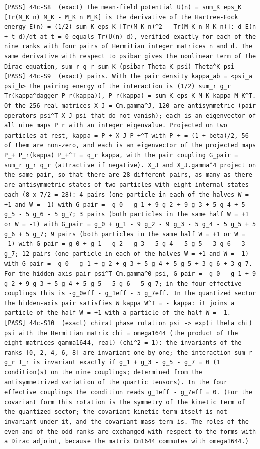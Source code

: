 \documentclass[
  10pt,
]{article}
\begin{document}
\begin{verbatim}
[PASS] 44c-S8  (exact) the mean-field potential U(n) = sum_K eps_K [Tr(M_K n) M_K - M_K n M_K] is the derivative of the Hartree-Fock energy E(n) = (1/2) sum_K eps_K [Tr(M_K n)^2 - Tr(M_K n M_K n)]: d E(n + t d)/dt at t = 0 equals Tr(U(n) d), verified exactly for each of the nine ranks with four pairs of Hermitian integer matrices n and d. The same derivative with respect to psibar gives the nonlinear term of the Dirac equation, sum_r g_r sum_K (psibar Theta_K psi) Theta^K psi
[PASS] 44c-S9  (exact) pairs. With the pair density kappa_ab = <psi_a psi_b> the pairing energy of the interaction is (1/2) sum_r g_r Tr(kappa^dagger P_r(kappa)), P_r(kappa) = sum_K eps_K M_K kappa M_K^T. Of the 256 real matrices X_J = Cm.gamma^J, 120 are antisymmetric (pair operators psi^T X_J psi that do not vanish); each is an eigenvector of all nine maps P_r with an integer eigenvalue. Projected on two particles at rest, kappa = P_+ X_J P_+^T with P_+ = (1 + beta)/2, 56 of them are non-zero, and each is an eigenvector of the projected maps P_+ P_r(kappa) P_+^T = q_r kappa, with the pair coupling G_pair = sum_r g_r q_r (attractive if negative). X_J and X_J.gamma^4 project on the same pair, so that there are 28 different pairs, as many as there are antisymmetric states of two particles with eight internal states each (8 x 7/2 = 28): 4 pairs (one particle in each of the halves W = +1 and W = -1) with G_pair = -g_0 - g_1 + 9 g_2 + 9 g_3 + 5 g_4 + 5 g_5 - 5 g_6 - 5 g_7; 3 pairs (both particles in the same half W = +1 or W = -1) with G_pair = g_0 + g_1 - 9 g_2 - 9 g_3 - 5 g_4 - 5 g_5 + 5 g_6 + 5 g_7; 9 pairs (both particles in the same half W = +1 or W = -1) with G_pair = g_0 + g_1 - g_2 - g_3 - 5 g_4 - 5 g_5 - 3 g_6 - 3 g_7; 12 pairs (one particle in each of the halves W = +1 and W = -1) with G_pair = -g_0 - g_1 + g_2 + g_3 + 5 g_4 + 5 g_5 + 3 g_6 + 3 g_7. For the hidden-axis pair psi^T Cm.gamma^0 psi, G_pair = -g_0 - g_1 + 9 g_2 + 9 g_3 + 5 g_4 + 5 g_5 - 5 g_6 - 5 g_7; in the four effective couplings this is -g_0eff - g_1eff - 5 g_7eff. In the quantized sector the hidden-axis pair satisfies W kappa W^T = - kappa: it joins a particle of the half W = +1 with a particle of the half W = -1.
[PASS] 44c-S10  (exact) chiral phase rotation psi -> exp(i theta chi) psi with the Hermitian matrix chi = omega1644 (the product of the eight matrices gamma1644, real) (chi^2 = 1): the invariants of the ranks [0, 2, 4, 6, 8] are invariant one by one; the interaction sum_r g_r I_r is invariant exactly if g_1 + g_3 - g_5 - g_7 = 0 (1 condition(s) on the nine couplings; determined from the antisymmetrized variation of the quartic tensors). In the four effective couplings the condition reads g_1eff - g_7eff = 0. (For the covariant form this rotation is the symmetry of the kinetic term of the quantized sector; the covariant kinetic term itself is not invariant under it, and the covariant mass term is. The roles of the even and of the odd ranks are exchanged with respect to the forms with a Dirac adjoint, because the matrix Cm1644 commutes with omega1644.)

\end{verbatim}
\end{document}
